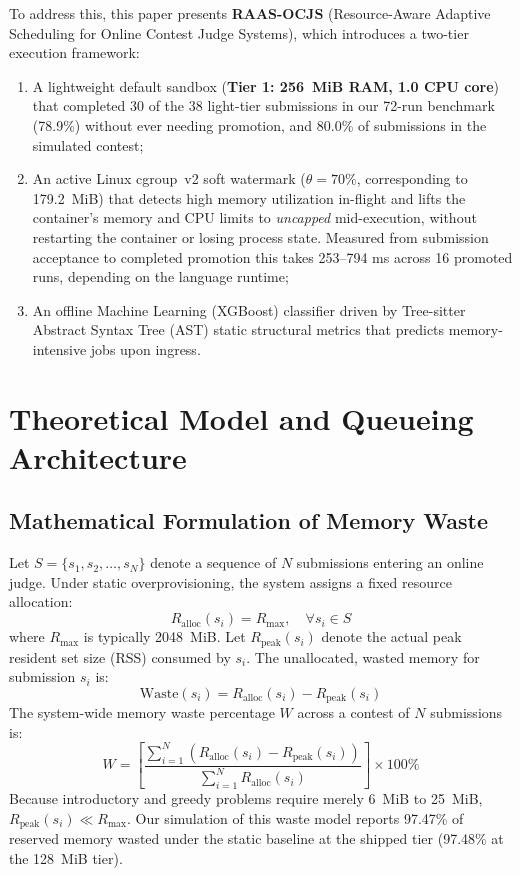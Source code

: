 \documentclass[conference]{IEEEtran}
\begin{document}
To address this, this paper presents \textbf{RAAS-OCJS} (Resource-Aware Adaptive Scheduling for Online Contest Judge Systems), which introduces a two-tier execution framework:
\begin{enumerate}
    \item A lightweight default sandbox (\textbf{Tier 1: 256~MiB RAM, 1.0 CPU core}) that completed 30 of the 38 light-tier submissions in our 72-run benchmark (78.9\%) without ever needing promotion, and 80.0\% of submissions in the simulated contest;
    \item An active Linux cgroup~v2 soft watermark ($\theta = 70\%$, corresponding to 179.2~MiB) that detects high memory utilization in-flight and lifts the container's memory and CPU limits to \emph{uncapped} mid-execution, without restarting the container or losing process state. Measured from submission acceptance to completed promotion this takes 253--794 ms across 16 promoted runs, depending on the language runtime;
    \item An offline Machine Learning (XGBoost) classifier driven by Tree-sitter Abstract Syntax Tree (AST) static structural metrics that predicts memory-intensive jobs upon ingress.
\end{enumerate}



\section{Theoretical Model and Queueing Architecture}

\subsection{Mathematical Formulation of Memory Waste}
Let $S = \{s_1, s_2, \dots, s_N\}$ denote a sequence of $N$ submissions entering an online judge. Under static overprovisioning, the system assigns a fixed resource allocation:
\begin{equation}
R_{\mathrm{alloc}}(s_i) = R_{\mathrm{max}}, \quad \forall s_i \in S
\end{equation}
where $R_{\mathrm{max}}$ is typically 2048~MiB. Let $R_{\mathrm{peak}}(s_i)$ denote the actual peak resident set size (RSS) consumed by $s_i$. The unallocated, wasted memory for submission $s_i$ is:
\begin{equation}
\mathrm{Waste}(s_i) = R_{\mathrm{alloc}}(s_i) - R_{\mathrm{peak}}(s_i)
\end{equation}
The system-wide memory waste percentage $W$ across a contest of $N$ submissions is:
\begin{equation}
W = \left[ \frac{\sum_{i=1}^N \left( R_{\mathrm{alloc}}(s_i) - R_{\mathrm{peak}}(s_i) \right)}{\sum_{i=1}^N R_{\mathrm{alloc}}(s_i)} \right] \times 100\%
\end{equation}
Because introductory and greedy problems require merely 6~MiB to 25~MiB, $R_{\mathrm{peak}}(s_i) \ll R_{\mathrm{max}}$. Our simulation of this waste model reports 97.47\% of reserved memory wasted under the static baseline at the shipped tier (97.48\% at the 128~MiB tier).
\end{document}
